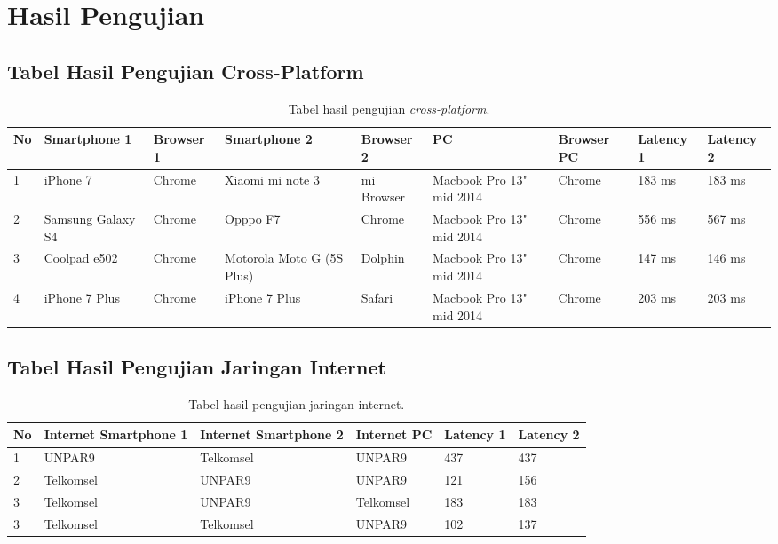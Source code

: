 \chapter{Hasil Pengujian}
\label{lamp:C}

\section{Tabel Hasil Pengujian Cross-Platform}
\begin{table}[H]
	\centering
	\caption{Tabel hasil pengujian \textit{cross-platform}.}
	\begin{adjustbox}{width=\textwidth}
		\begin{tabular}{|p{0.35cm}|p{3cm}|p{2cm}|p{3cm}|p{2cm}|p{2cm}|p{2cm}|p{2cm}|p{2cm}|}
			\hline
			No & Smartphone 1 & Browser 1 & Smartphone 2 & Browser 2 & PC & Browser PC & Latency 1 & Latency 2 \\ \hline
			1 & iPhone 7 & Chrome & Xiaomi mi note 3 & mi Browser & Macbook Pro 13" mid 2014 & Chrome & 183 ms & 183 ms \\ \hline
			2 & Samsung Galaxy S4 & Chrome & Opppo F7 & Chrome & Macbook Pro 13" mid 2014 & Chrome & 556 ms & 567 ms \\ \hline	
			3 & Coolpad e502 & Chrome & Motorola Moto G (5S Plus) & Dolphin & Macbook Pro 13" mid 2014 & Chrome & 147 ms & 146 ms \\ \hline
			4 & iPhone 7 Plus & Chrome & iPhone 7 Plus & Safari & Macbook Pro 13" mid 2014 & Chrome & 203 ms & 203 ms \\ \hline	
		\end{tabular}
	\end{adjustbox}
	\label{table:pengujian_crossplatform}
\end{table}

\section{Tabel Hasil Pengujian Jaringan Internet}
\begin{table}[H]
	\centering
	\caption{Tabel hasil pengujian jaringan internet.}
	\begin{adjustbox}{width=\textwidth}
		\begin{tabular}{|p{0.35cm}|p{4cm}|p{4cm}|p{3cm}|p{2cm}|p{2cm}|}
			\hline
			No & Internet Smartphone 1 & Internet Smartphone 2 & Internet PC & Latency 1 & Latency 2 \\ \hline
			1 & UNPAR9 & Telkomsel & UNPAR9 & 437 & 437 \\ \hline
			2 & Telkomsel & UNPAR9 & UNPAR9 & 121 & 156 \\ \hline
			3 & Telkomsel & UNPAR9 & Telkomsel & 183 & 183 \\ \hline
			3 & Telkomsel & Telkomsel & UNPAR9 & 102 & 137 \\ \hline
		\end{tabular}
	\end{adjustbox}
	
	\label{table:pengujian_internet}
\end{table}